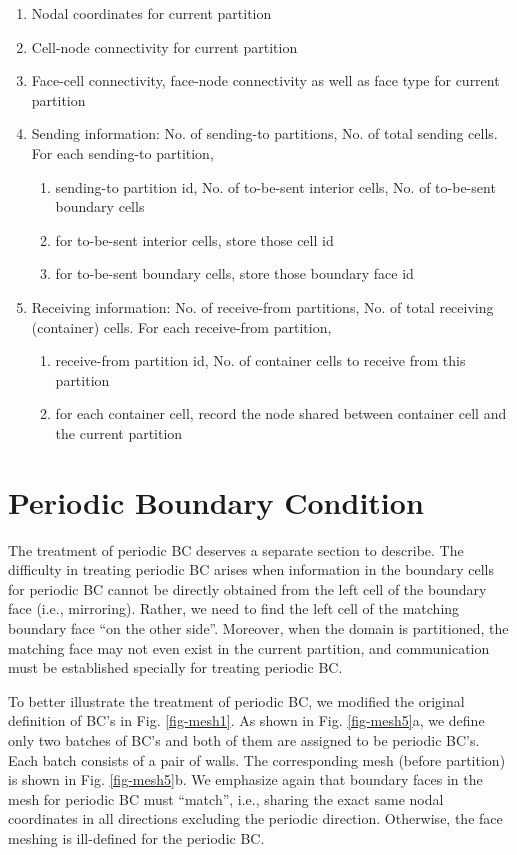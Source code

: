 \documentclass[11pt, letterpaper]{report}
\begin{document}
\begin{enumerate}
   \item Nodal coordinates for current partition
   \item Cell-node connectivity for current partition
   \item Face-cell connectivity, face-node connectivity as well as face type for current partition
   \item Sending information: No. of sending-to partitions, No. of total sending cells. For each
      sending-to partition,
      \begin{enumerate}
         \item sending-to partition id, No. of to-be-sent interior cells, No. of to-be-sent boundary cells
         \item for to-be-sent interior cells, store those cell id
         \item for to-be-sent boundary cells, store those boundary face id
      \end{enumerate}
   \item Receiving information: No. of receive-from partitions, No. of total receiving (container)
      cells. For each receive-from partition, 
      \begin{enumerate}
         \item receive-from partition id, No. of container cells to receive from this partition
         \item for each container cell, record the node shared between container cell and the
            current partition
      \end{enumerate}
\end{enumerate}
\paraspace

\section{Periodic Boundary Condition} \label{c1s4}

The treatment of periodic BC deserves a separate section to describe. The difficulty in treating
periodic BC arises when information in the boundary cells for periodic BC cannot be directly
obtained from the left cell of the boundary face (i.e., mirroring). Rather, we need to find the left
cell of the matching boundary face ``on the other side''. Moreover, when the domain is partitioned,
the matching face may not even exist in the current partition, and communication must be established
specially for treating periodic BC.
\paraspace

To better illustrate the treatment of periodic BC, we modified the original definition of BC's in
Fig. \ref{fig-mesh1}. As shown in Fig. \ref{fig-mesh5}a, we define only two batches of BC's and both of them are
assigned to be periodic BC's. Each batch consists of a pair of walls. The corresponding mesh (before
partition) is shown in Fig. \ref{fig-mesh5}b. We emphasize again that boundary faces in the mesh for periodic BC
must ``match'', i.e., sharing the exact same nodal coordinates in all directions excluding the
periodic direction. Otherwise, the face meshing is ill-defined for the periodic BC.
\end{document}
